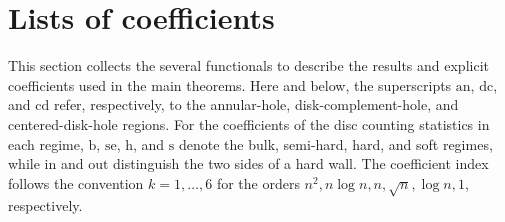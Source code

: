 \documentclass[a4paper]{article}
\numberwithin{equation}{section}
\begin{document}
\section{Lists of coefficients}
\label{section:coefficient-catalogue}

This section collects the several functionals to describe the results and explicit coefficients used
in the main theorems.  
Here and below, the superscripts $\mathrm{an}$, $\mathrm{dc}$, and
$\mathrm{cd}$ refer, respectively, to the annular-hole,
disk-complement-hole, and centered-disk-hole regions. For the coefficients of the disc counting statistics in each regime, $\mathrm b$, $\mathrm{se}$, $\mathrm h$, and $\mathrm s$
denote the bulk, semi-hard, hard, and soft regimes, while $\mathrm{in}$ and
$\mathrm{out}$ distinguish the two sides of a hard wall.
The coefficient index follows the convention
$k=1,\ldots,6$ for the orders
$n^2,n\log n,n,\sqrt n,\log n,1$, respectively.  
\end{document}
